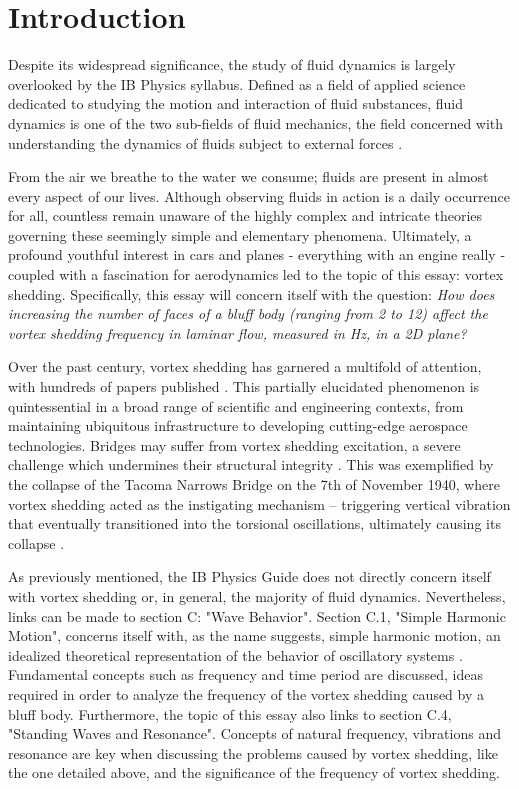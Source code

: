 \section{Introduction}

Despite its widespread significance, the study of fluid dynamics is largely overlooked by the IB Physics syllabus. Defined as a field of applied science dedicated to studying the motion and interaction of fluid substances, fluid dynamics is one of the two sub-fields of fluid mechanics, the field concerned with understanding the dynamics of fluids subject to external forces \parencite{livescience_fluid_dynamics}. 

From the air we breathe to the water we consume; fluids are present in almost every aspect of our lives. Although observing fluids in action is a daily occurrence for all, countless remain unaware of the highly complex and intricate theories governing these seemingly simple and elementary phenomena. Ultimately, a profound youthful interest in cars and planes - everything with an engine really - coupled with a fascination for aerodynamics led to the topic of this essay: vortex shedding. Specifically, this essay will concern itself with the question: \textit{How does increasing the number of faces of a bluff body (ranging from 2 to 12) affect the vortex shedding frequency in laminar flow, measured in Hz, in a 2D plane?}

Over the past century, vortex shedding has garnered a multifold of attention, with hundreds of papers published \parencite[61]{buresti1998}. This partially elucidated phenomenon is quintessential in a broad range of scientific and engineering contexts, from maintaining ubiquitous infrastructure to developing cutting-edge aerospace technologies. Bridges may suffer from vortex shedding excitation, a severe challenge which undermines their structural integrity \parencite[1040]{jurado2012}. This was exemplified by the collapse of the Tacoma Narrows Bridge on the 7th of November 1940, where vortex shedding acted as the instigating mechanism -- triggering vertical vibration that eventually transitioned into the torsional oscillations, ultimately causing its collapse \parencite{tacoma_bridge_vibrations}.

As previously mentioned, the IB Physics Guide \parencite{ib_physics_2025} does not directly concern itself with vortex shedding or, in general, the majority of fluid dynamics. Nevertheless, links can be made to section C: "Wave Behavior". Section C.1, "Simple Harmonic Motion", concerns itself with, as the name suggests, simple harmonic motion, an idealized theoretical representation of the behavior of oscillatory systems \parencite[313]{allum2023}. Fundamental concepts such as frequency and time period are discussed, ideas required in order to analyze the frequency of the vortex shedding caused by a bluff body. Furthermore, the topic of this essay also links to section C.4, "Standing Waves and Resonance". Concepts of natural frequency, vibrations and resonance are key when discussing the problems caused by vortex shedding, like the one detailed above, and the significance of the frequency of vortex shedding. 





